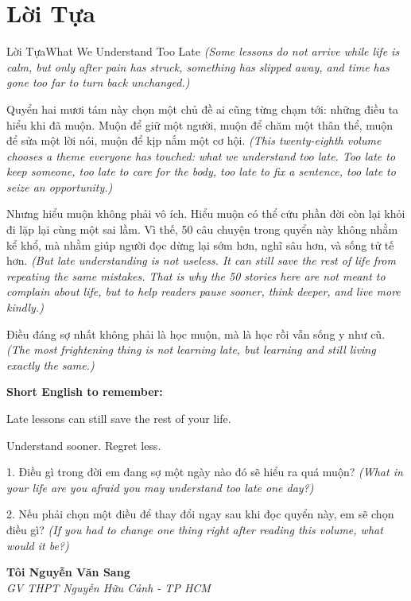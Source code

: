 \chapter*{Lời Tựa}

\begin{truyen}{Lời Tựa}{What We Understand Too Late}
\textit{(Some lessons do not arrive while life is calm, but only after pain has struck, something has slipped away, and time has gone too far to turn back unchanged.)}

Quyển hai mươi tám này chọn một chủ đề ai cũng từng chạm tới: những điều ta hiểu khi đã muộn. Muộn để giữ một người, muộn để chăm một thân thể, muộn để sửa một lời nói, muộn để kịp nắm một cơ hội.
\textit{(This twenty-eighth volume chooses a theme everyone has touched: what we understand too late. Too late to keep someone, too late to care for the body, too late to fix a sentence, too late to seize an opportunity.)}

Nhưng hiểu muộn không phải vô ích. Hiểu muộn có thể cứu phần đời còn lại khỏi đi lặp lại cùng một sai lầm. Vì thế, 50 câu chuyện trong quyển này không nhằm kể khổ, mà nhằm giúp người đọc dừng lại sớm hơn, nghĩ sâu hơn, và sống tử tế hơn.
\textit{(But late understanding is not useless. It can still save the rest of life from repeating the same mistakes. That is why the 50 stories here are not meant to complain about life, but to help readers pause sooner, think deeper, and live more kindly.)}
\end{truyen}

\begin{baihoc}
Điều đáng sợ nhất không phải là học muộn, mà là học rồi vẫn sống y như cũ.
\textit{(The most frightening thing is not learning late, but learning and still living exactly the same.)}
\end{baihoc}

\begin{ghinhoanh}
\textbf{Short English to remember:}

Late lessons can still save the rest of your life.

Understand sooner. Regret less.
\end{ghinhoanh}

\begin{tuhocnhanh}
1. Điều gì trong đời em đang sợ một ngày nào đó sẽ hiểu ra quá muộn? \textit{(What in your life are you afraid you may understand too late one day?)}

2. Nếu phải chọn một điều để thay đổi ngay sau khi đọc quyển này, em sẽ chọn điều gì? \textit{(If you had to change one thing right after reading this volume, what would it be?)}
\end{tuhocnhanh}

\begin{flushright}
\textbf{Tôi Nguyễn Văn Sang}\\
\textit{GV THPT Nguyễn Hữu Cảnh - TP HCM}
\end{flushright}

\ngancach